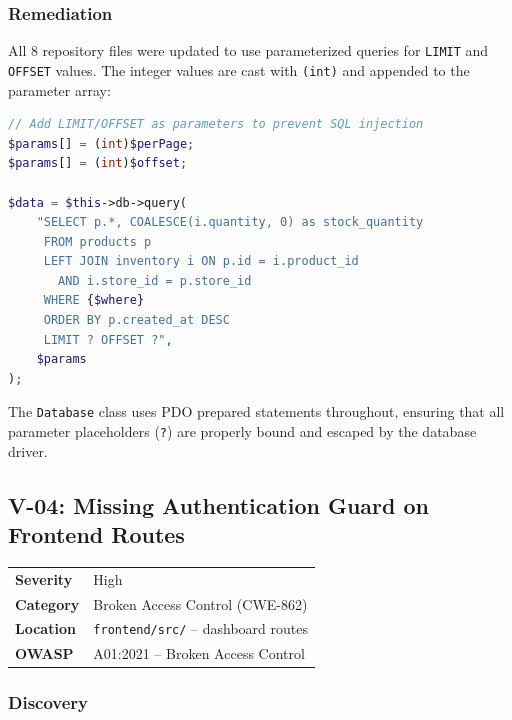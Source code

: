 \documentclass[12pt,a4paper]{article}
\begin{document}
\subsubsection{Remediation}

All 8 repository files were updated to use parameterized queries for \texttt{LIMIT} and \texttt{OFFSET} values. The integer values are cast with \texttt{(int)} and appended to the parameter array:

\begin{lstlisting}[language=PHP, caption={Fixed code -- parameterized LIMIT/OFFSET}]
// Add LIMIT/OFFSET as parameters to prevent SQL injection
$params[] = (int)$perPage;
$params[] = (int)$offset;

$data = $this->db->query(
    "SELECT p.*, COALESCE(i.quantity, 0) as stock_quantity
     FROM products p
     LEFT JOIN inventory i ON p.id = i.product_id
       AND i.store_id = p.store_id
     WHERE {$where}
     ORDER BY p.created_at DESC
     LIMIT ? OFFSET ?",
    $params
);
\end{lstlisting}

The \texttt{Database} class uses PDO prepared statements throughout, ensuring that all parameter placeholders (\texttt{?}) are properly bound and escaped by the database driver.

\subsection{V-04: Missing Authentication Guard on Frontend Routes}

\begin{table}[H]
\centering
\begin{tabularx}{\textwidth}{lX}
\toprule
\textbf{Severity} & \textcolor{high}{High} \\
\textbf{Category} & Broken Access Control (CWE-862) \\
\textbf{Location} & \texttt{frontend/src/} -- dashboard routes \\
\textbf{OWASP} & A01:2021 -- Broken Access Control \\
\bottomrule
\end{tabularx}
\end{table}

\subsubsection{Discovery}
\end{document}
